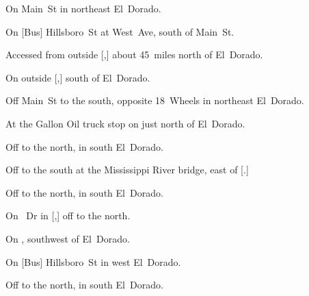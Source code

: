 
\begin{LocationList}

On  Main~St in northeast El~Dorado.

On [Bus] Hillsboro~St at West~Ave, south of Main~St.

Accessed from  outside [,] about 45~miles north of El~Dorado.

On   outside [,] south of El~Dorado.

Off  Main~St to the south, opposite 18~Wheels in northeast El~Dorado.

At the Gallon Oil truck stop on  just north of El~Dorado.

\Location{\GarageHQ \Garage}
Off   to the north, in south El~Dorado.

Off  to the south at the Mississippi River bridge, east of [.]

Off   to the north, in south El~Dorado.

On \MLKing~Dr in [,] off  to the north.

On , southwest of El~Dorado.

On [Bus] Hillsboro~St in west El~Dorado.

Off   to the north, in south El~Dorado.

\end{LocationList}
